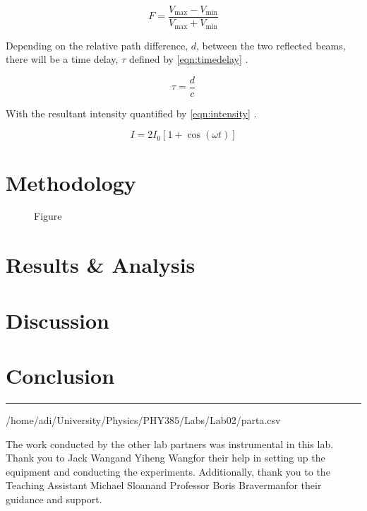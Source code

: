 \documentclass[aip, cp, amsmath, amssymb, reprint]{revtex4-2}
\newcommand\advname{Boris Braverman\space} %
\newcommand\taname{Michael Sloan\space} %
\newcommand\lponename{Jack Wang\space}
\newcommand\lptwoname{Yiheng Wang\space}
\begin{document}
        \begin{equation} \label{eqn:fringeconstrast}
            F = \dfrac{V_{\text{max}} - V_{\text{min}}}{V_{\text{max}} + V_{\text{min}}}
        \end{equation}

        Depending on the relative path difference, $d$, between the two reflected beams, there will be a time delay, $\tau$ defined by \eqref{eqn:timedelay} \cite{pwoptics}.

        \begin{equation} \label{eqn:timedelay}
            \tau = \dfrac{d}{c}
        \end{equation}            

        With the resultant intensity quantified by \eqref{eqn:intensity} \cite{pwoptics}.

        \begin{equation} \label{eqn:intensity}
            I = 2 I_0 \left[1 +  \cos(\omega t)\right]
        \end{equation}


    \section{Methodology}

        \begin{figure}[H]
            
            \caption{Figure}
        \end{figure}



    \section{Results \& Analysis}
        
    
    \section{Discussion}
    
    
    \section{Conclusion}



    \onecolumngrid
    \begin{center}
        \vspace{0.8cm}
        \noindent\rule{0.9\textwidth}{0.5pt}
    \end{center}
/home/adi/University/Physics/PHY385/Labs/Lab02/parta.csv
    \begin{acknowledgments}
        The work conducted by the other lab partners was instrumental in this lab. Thank you to \lponename and \lptwoname for their help in setting up the equipment and conducting the experiments. Additionally, thank you to the Teaching Assistant \taname and Professor \advname for their guidance and support.
    \end{acknowledgments}
\end{document}
